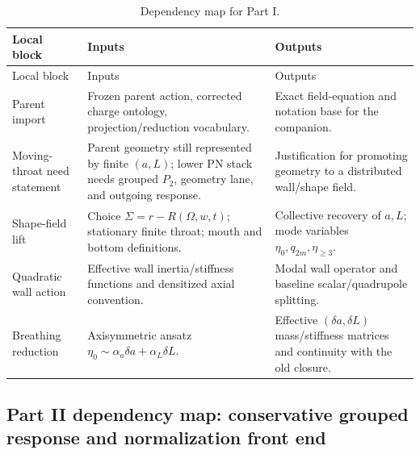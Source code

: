 \begin{longtable}{L{0.18\textwidth}L{0.29\textwidth}L{0.35\textwidth}}
\caption{Dependency map for Part I.}\label{tab:dep-part-i}\\
\toprule
Local block & Inputs & Outputs \\
\midrule
\endfirsthead
\toprule
Local block & Inputs & Outputs \\
\midrule
\endhead
Parent import & Frozen parent action, corrected charge ontology, projection/reduction vocabulary. & Exact field-equation and notation base for the companion. \\
\addlinespace
Moving-throat need statement & Parent geometry still represented by finite \((a,L)\); lower PN stack needs grouped \(P_2\), geometry lane, and outgoing response. & Justification for promoting geometry to a distributed wall/shape field. \\
\addlinespace
Shape-field lift & Choice \(\Sigma=r-R(\Omega,w,t)\); stationary finite throat; mouth and bottom definitions. & Collective recovery of \(a,L\); mode variables \(\eta_0,q_{2m},\eta_{\ge3}\). \\
\addlinespace
Quadratic wall action & Effective wall inertia/stiffness functions and densitized axial convention. & Modal wall operator and baseline scalar/quadrupole splitting. \\
\addlinespace
Breathing reduction & Axisymmetric ansatz \(\eta_0\sim \alpha_a\delta a+\alpha_L\delta L\). & Effective \((\delta a,
\delta L)\) mass/stiffness matrices and continuity with the old closure. \\
\bottomrule
\end{longtable}

\subsection{Part II dependency map: conservative grouped response and normalization front end}
\label{subsec:dep-part-ii}

